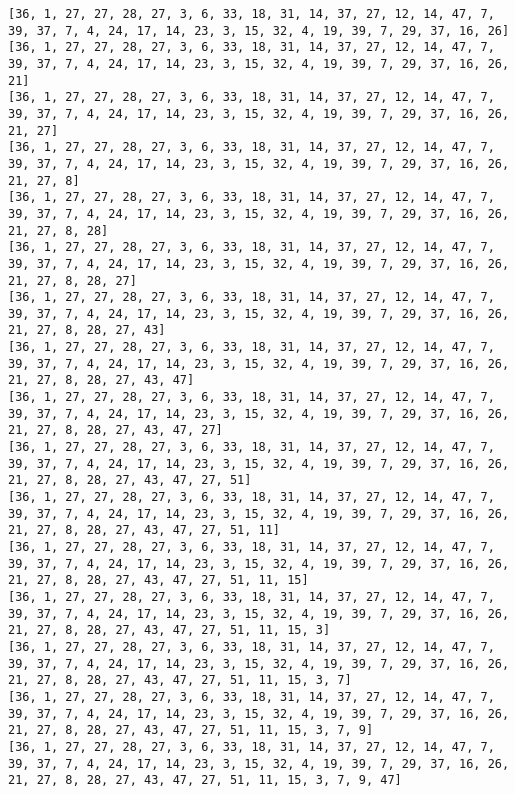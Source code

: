 \documentclass[11pt]{article}
\begin{document}
\begin{Verbatim}[commandchars=\\\{\}]
[36, 1, 27, 27, 28, 27, 3, 6, 33, 18, 31, 14, 37, 27, 12, 14, 47, 7, 39, 37, 7, 4, 24, 17, 14, 23, 3, 15, 32, 4, 19, 39, 7, 29, 37, 16, 26]
[36, 1, 27, 27, 28, 27, 3, 6, 33, 18, 31, 14, 37, 27, 12, 14, 47, 7, 39, 37, 7, 4, 24, 17, 14, 23, 3, 15, 32, 4, 19, 39, 7, 29, 37, 16, 26, 21]
[36, 1, 27, 27, 28, 27, 3, 6, 33, 18, 31, 14, 37, 27, 12, 14, 47, 7, 39, 37, 7, 4, 24, 17, 14, 23, 3, 15, 32, 4, 19, 39, 7, 29, 37, 16, 26, 21, 27]
[36, 1, 27, 27, 28, 27, 3, 6, 33, 18, 31, 14, 37, 27, 12, 14, 47, 7, 39, 37, 7, 4, 24, 17, 14, 23, 3, 15, 32, 4, 19, 39, 7, 29, 37, 16, 26, 21, 27, 8]
[36, 1, 27, 27, 28, 27, 3, 6, 33, 18, 31, 14, 37, 27, 12, 14, 47, 7, 39, 37, 7, 4, 24, 17, 14, 23, 3, 15, 32, 4, 19, 39, 7, 29, 37, 16, 26, 21, 27, 8, 28]
[36, 1, 27, 27, 28, 27, 3, 6, 33, 18, 31, 14, 37, 27, 12, 14, 47, 7, 39, 37, 7, 4, 24, 17, 14, 23, 3, 15, 32, 4, 19, 39, 7, 29, 37, 16, 26, 21, 27, 8, 28, 27]
[36, 1, 27, 27, 28, 27, 3, 6, 33, 18, 31, 14, 37, 27, 12, 14, 47, 7, 39, 37, 7, 4, 24, 17, 14, 23, 3, 15, 32, 4, 19, 39, 7, 29, 37, 16, 26, 21, 27, 8, 28, 27, 43]
[36, 1, 27, 27, 28, 27, 3, 6, 33, 18, 31, 14, 37, 27, 12, 14, 47, 7, 39, 37, 7, 4, 24, 17, 14, 23, 3, 15, 32, 4, 19, 39, 7, 29, 37, 16, 26, 21, 27, 8, 28, 27, 43, 47]
[36, 1, 27, 27, 28, 27, 3, 6, 33, 18, 31, 14, 37, 27, 12, 14, 47, 7, 39, 37, 7, 4, 24, 17, 14, 23, 3, 15, 32, 4, 19, 39, 7, 29, 37, 16, 26, 21, 27, 8, 28, 27, 43, 47, 27]
[36, 1, 27, 27, 28, 27, 3, 6, 33, 18, 31, 14, 37, 27, 12, 14, 47, 7, 39, 37, 7, 4, 24, 17, 14, 23, 3, 15, 32, 4, 19, 39, 7, 29, 37, 16, 26, 21, 27, 8, 28, 27, 43, 47, 27, 51]
[36, 1, 27, 27, 28, 27, 3, 6, 33, 18, 31, 14, 37, 27, 12, 14, 47, 7, 39, 37, 7, 4, 24, 17, 14, 23, 3, 15, 32, 4, 19, 39, 7, 29, 37, 16, 26, 21, 27, 8, 28, 27, 43, 47, 27, 51, 11]
[36, 1, 27, 27, 28, 27, 3, 6, 33, 18, 31, 14, 37, 27, 12, 14, 47, 7, 39, 37, 7, 4, 24, 17, 14, 23, 3, 15, 32, 4, 19, 39, 7, 29, 37, 16, 26, 21, 27, 8, 28, 27, 43, 47, 27, 51, 11, 15]
[36, 1, 27, 27, 28, 27, 3, 6, 33, 18, 31, 14, 37, 27, 12, 14, 47, 7, 39, 37, 7, 4, 24, 17, 14, 23, 3, 15, 32, 4, 19, 39, 7, 29, 37, 16, 26, 21, 27, 8, 28, 27, 43, 47, 27, 51, 11, 15, 3]
[36, 1, 27, 27, 28, 27, 3, 6, 33, 18, 31, 14, 37, 27, 12, 14, 47, 7, 39, 37, 7, 4, 24, 17, 14, 23, 3, 15, 32, 4, 19, 39, 7, 29, 37, 16, 26, 21, 27, 8, 28, 27, 43, 47, 27, 51, 11, 15, 3, 7]
[36, 1, 27, 27, 28, 27, 3, 6, 33, 18, 31, 14, 37, 27, 12, 14, 47, 7, 39, 37, 7, 4, 24, 17, 14, 23, 3, 15, 32, 4, 19, 39, 7, 29, 37, 16, 26, 21, 27, 8, 28, 27, 43, 47, 27, 51, 11, 15, 3, 7, 9]
[36, 1, 27, 27, 28, 27, 3, 6, 33, 18, 31, 14, 37, 27, 12, 14, 47, 7, 39, 37, 7, 4, 24, 17, 14, 23, 3, 15, 32, 4, 19, 39, 7, 29, 37, 16, 26, 21, 27, 8, 28, 27, 43, 47, 27, 51, 11, 15, 3, 7, 9, 47]

\end{Verbatim}
\end{document}
